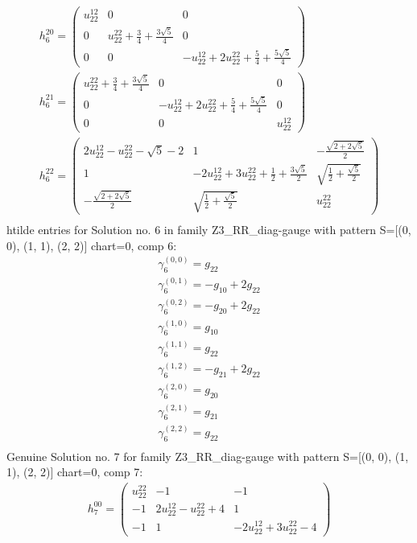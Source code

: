 \documentclass[a4paper, 11pt, twoside, onecolumn]{article}
\begin{document}
\begin{landscape}
\begin{gather*}
	 h_6^{20}=\begin{pmatrix}u^{12}_{22} & 0 & 0\\0 & u^{22}_{22} + \frac{3}{4} + \frac{3 \sqrt{5}}{4} & 0\\0 & 0 & - u^{12}_{22} + 2 u^{22}_{22} + \frac{5}{4} + \frac{5 \sqrt{5}}{4}\end{pmatrix}\\ 
	 h_6^{21}=\begin{pmatrix}u^{22}_{22} + \frac{3}{4} + \frac{3 \sqrt{5}}{4} & 0 & 0\\0 & - u^{12}_{22} + 2 u^{22}_{22} + \frac{5}{4} + \frac{5 \sqrt{5}}{4} & 0\\0 & 0 & u^{12}_{22}\end{pmatrix}\\ 
	 h_6^{22}=\begin{pmatrix}2 u^{12}_{22} - u^{22}_{22} - \sqrt{5} - 2 & 1 & - \frac{\sqrt{2 + 2 \sqrt{5}}}{2}\\1 & - 2 u^{12}_{22} + 3 u^{22}_{22} + \frac{1}{2} + \frac{3 \sqrt{5}}{2} & \sqrt{\frac{1}{2} + \frac{\sqrt{5}}{2}}\\- \frac{\sqrt{2 + 2 \sqrt{5}}}{2} & \sqrt{\frac{1}{2} + \frac{\sqrt{5}}{2}} & u^{22}_{22}\end{pmatrix}\\ 
\end{gather*} 
htilde entries for Solution no. 6 in family Z3_RR_diag-gauge with pattern S=[(0, 0), (1, 1), (2, 2)] chart=0, comp 6: 
\begin{gather*} 
	 \gamma^{(0, 0)}_6=g_{22}\\ 
	 \gamma^{(0, 1)}_6=- g_{10} + 2 g_{22}\\ 
	 \gamma^{(0, 2)}_6=- g_{20} + 2 g_{22}\\ 
	 \gamma^{(1, 0)}_6=g_{10}\\ 
	 \gamma^{(1, 1)}_6=g_{22}\\ 
	 \gamma^{(1, 2)}_6=- g_{21} + 2 g_{22}\\ 
	 \gamma^{(2, 0)}_6=g_{20}\\ 
	 \gamma^{(2, 1)}_6=g_{21}\\ 
	 \gamma^{(2, 2)}_6=g_{22}\\ 
\end{gather*} 
Genuine Solution no. 7 for family Z3_RR_diag-gauge with pattern S=[(0, 0), (1, 1), (2, 2)] chart=0, comp 7: 
\begin{gather*} 
	 h_7^{00}=\begin{pmatrix}u^{22}_{22} & -1 & -1\\-1 & 2 u^{12}_{22} - u^{22}_{22} + 4 & 1\\-1 & 1 & - 2 u^{12}_{22} + 3 u^{22}_{22} - 4\end{pmatrix}\\ 

\end{gather*}
\end{landscape}
\end{document}
